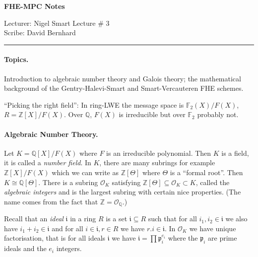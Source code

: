 \documentclass[11pt]{article}
\newcommand{\F}{\mathbb{F}}
\newcommand{\Z}{\mathbb{Z}}
\newcommand{\Q}{\mathbb{Q}}
\renewcommand{\O}{\mathcal{O}}
\renewcommand{\i}{\mathfrak{i}}
\newcommand{\p}{\mathfrak{p}}
\begin{document}
\thispagestyle{empty}


\begin{center}
\bf\large FHE-MPC Notes
\end{center}

\noindent
Lecturer: Nigel Smart                %
\hfill
Lecture \# 3              %
\\
Scribe: David Bernhard                 %
\hfill

\noindent
\rule{\textwidth}{1pt}

\medskip


\paragraph{Topics.}
Introduction to algebraic number theory and Galois theory; 
the mathematical background of the Gentry-Halevi-Smart and Smart-Vercauteren FHE schemes.

``Picking the right field'':
In ring-LWE the message space is $\F_2(X)/F(X)$, $R = \Z[X]/F(X)$. 
Over $\Q$, $F(X)$ is irreducible but over $\F_2$ probably not.

\paragraph{Algebraic Number Theory.}
Let $K = \Q[X] / F(X)$ where $F$ is an irreducible polynomial. 
Then $K$ is a field, it is called a \emph{number field}.
In $K$, there are many subrings for example $\Z[X] / F(X)$ which we can write as $\Z[\Theta]$ where $\Theta$ is a ``formal root''.
Then $K \cong \Q[\Theta]$.
There is a subring $\O_K$ satisfying $\Z[\Theta] \subseteq \O_K \subset K$, called the \emph{algebraic integers} and is the largest subring with certain nice properties. (The name comes from the fact that $\Z = \O_\Q$.)

Recall that an \emph{ideal} $\i$ in a ring $R$ is a set $\i \subseteq R$ such that for all $i_1, i_2 \in \i$ we also have $i_1 + i_2 \in \i$ and for all $i \in \i, r \in R$ we have $r.i \in \i$.
In $\O_K$ we have unique factorisation, that is for all ideals $\i$ we have $\i = \prod \p_i^{e_i}$ where the $\p_i$ are prime ideals and the $e_i$ integers.
\end{document}
